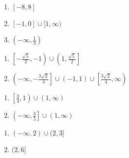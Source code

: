 \documentclass{ximera}
\begin{document}
\begin{multicols}{3}
\begin{enumerate}
\setcounter{enumi}{\value{HW}}

\item  $[-8,8]$    
\item  $[-1, 0] \cup [1, \infty)$  
\item $\left(-\infty, \frac{1}{3} \right)$

\setcounter{HW}{\value{enumi}}
\end{enumerate}
\end{multicols}

\begin{multicols}{2}
\begin{enumerate}
\setcounter{enumi}{\value{HW}}

\item $\left[ -\frac{\sqrt{5}}{2}, -1\right) \cup \left(1, \frac{\sqrt{5}}{2}\right]$
\item  $\left(-\infty, -\frac{3\sqrt{2}}{4} \right] \cup (-1,1) \cup \left[ \frac{3\sqrt{2}}{4}, \infty \right)$

\setcounter{HW}{\value{enumi}}
\end{enumerate}
\end{multicols}

\begin{multicols}{2}
\begin{enumerate}
\setcounter{enumi}{\value{HW}}


\item   $\left[ \frac{3}{4}, 1\right) \cup (1, \infty)$

\item $\left( -\infty, \frac{3}{5} \right] \cup (1, \infty)$

\setcounter{HW}{\value{enumi}}
\end{enumerate}
\end{multicols}

\begin{multicols}{2}
\begin{enumerate}
\setcounter{enumi}{\value{HW}}

\item  $(-\infty, 2) \cup (2,3]$
\item  $(2,6]$

\setcounter{HW}{\value{enumi}}
\end{enumerate}
\end{multicols}
\end{document}
